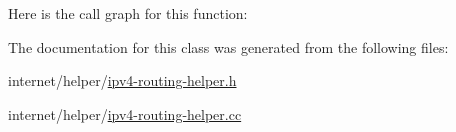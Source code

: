 Here is the call graph for this function\+:




The documentation for this class was generated from the following files\+:\begin{DoxyCompactItemize}
\item 
internet/helper/\hyperlink{ipv4-routing-helper_8h}{ipv4-\/routing-\/helper.\+h}\item 
internet/helper/\hyperlink{ipv4-routing-helper_8cc}{ipv4-\/routing-\/helper.\+cc}\end{DoxyCompactItemize}
